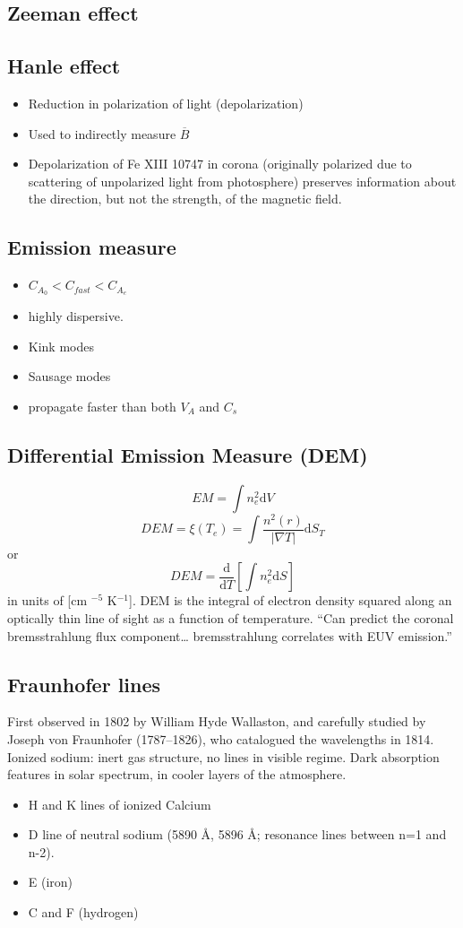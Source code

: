 \documentclass{article}
\begin{document}
\subsection{Zeeman effect}
\subsection{Hanle effect}
\begin{itemize}
    \item Reduction in polarization of light (depolarization)
    \item Used to indirectly measure $\overline{B}$
    \item Depolarization of Fe XIII 10747 in corona (originally polarized due
        to scattering of unpolarized light from photosphere) preserves
        information about the direction, but not the strength, of the magnetic
        field.
\end{itemize}
\subsection{Emission measure}
\begin{itemize}
    \item $C_{A_{0}} < C_{fast} < C_{A_{e}} $
    \item highly dispersive.
    \item Kink modes
    \item Sausage modes
    \item propagate faster than both $V_{A}$ and $C_{s}$
\end{itemize}
\subsection{Differential Emission Measure (DEM)}
\[
    EM = \int{n_{e}^{2}\mathrm{d}V}
    \]
\[
    DEM = \xi(T_{e}) = \int{\frac{n^{2}(r)}{|\nabla{T}|}\mathrm{d}S_{T}}
    \]
or
\[
    DEM = \frac{\mathrm{d}}{\mathrm{d}T}\left[\int{n_{e}^{2}\mathrm{d}S}\right]
    \]
in units of [cm ${^{-5}}$ K${^{-1}}$]. DEM is the integral of electron
density squared along an optically thin line of sight as a function of
temperature.
``Can predict the coronal bremsstrahlung flux component\ldots
bremsstrahlung correlates with EUV emission.''

\subsection{Fraunhofer lines}
First observed in 1802 by William Hyde Wallaston, and carefully
studied by Joseph von Fraunhofer (1787--1826), who catalogued
the wavelengths in 1814. Ionized sodium: inert gas structure,
no lines in visible regime. Dark absorption features in solar
spectrum, in cooler layers of the atmosphere.
\begin{itemize}
    \item H and K lines of ionized Calcium
    \item D line of neutral sodium (5890 \AA{}, 5896 \AA{};
        resonance lines between n=1 and n-2).
    \item E (iron)
    \item C and F (hydrogen)
\end{itemize}
\end{document}
